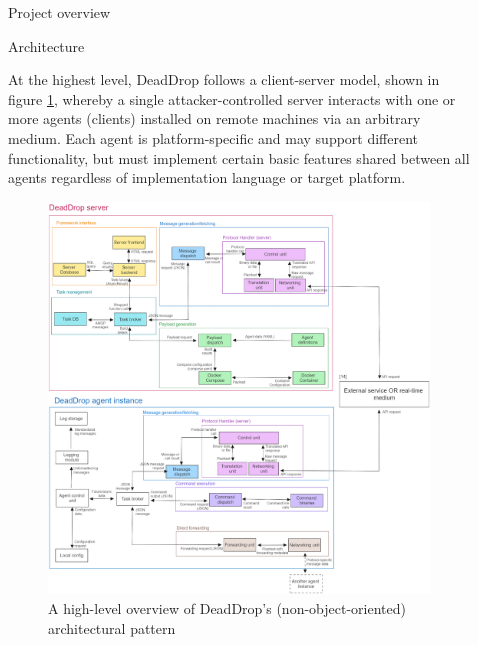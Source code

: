 \documentclass[final]{beamer}
\newlength{\sepwidth}
\newlength{\colwidth}
\newcommand{\separatorcolumn}{\begin{column}{\sepwidth}\end{column}}
\begin{document}
\begin{frame}[t]
\begin{columns}[t]
\begin{column}{\colwidth}
\begin{block}{Project overview}
  \end{block}

  \begin{block}{Architecture}

    At the highest level, DeadDrop follows a client-server model, shown in figure \ref{fig:arch}, whereby a single attacker-controlled server interacts with one or more agents (clients) installed on remote machines via an arbitrary medium. 
    Each agent is platform-specific and may support different functionality, but must implement certain basic features shared between all agents regardless of implementation language or target platform. 

    \begin{figure}
      \centering
      \includegraphics[width=\textwidth]{images/architecture.png}
      \caption{\quad A high-level overview of DeadDrop’s (non-object-oriented) architectural pattern}
      \label{fig:arch}
    \end{figure}

  \end{block}

\end{column}

\separatorcolumn

\begin{column}{\colwidth}


\end{column}
\end{columns}
\end{frame}
\end{document}
